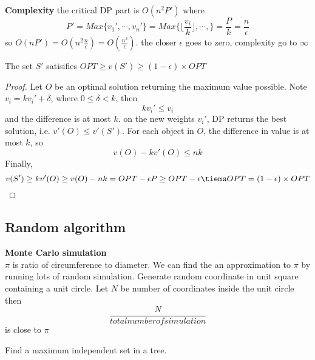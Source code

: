 \documentclass[11pt]{article}
\begin{document}
\begin{defn*}
    \textbf{Complexity} the critical DP part is $O(n^2P')$ where 
    \[
        P' = Max \{v_1', \cdots, v_n' \} = Max \{ \lfloor \frac{v_i}{k} \rfloor, \cdots, \} = \frac{P}{k} = \frac{n}{\epsilon}
    \]
    so $O(nP') = O(n^2 \frac{n}{\epsilon}) = O(\frac{n^3}{\epsilon})$. the closer $\epsilon$ goes to zero, complexity go to $\infty$
\end{defn*}



\begin{lemma*}
    The set $S'$ satisifies $OPT \geq v(S') \geq (1 - \epsilon) \times OPT$
    \begin{proof}
        Let $O$ be an optimal solution returning the maximum value possible. Note $v_i = kv_i' + \delta$, where $0\leq \delta < k$, then 
        \[
            k v_i' \leq v_i
        \]
        and the difference is at most $k$. on the new weights $v_i'$, DP returns the best solution, i.e. $v'(O) \leq v'(S')$. For each object in $O$, the difference in value is at most $k$, so
        \[
            v(O) - kv'(O) \leq nk
        \]
        Finally, 
        \[
            v(S') \geq kv'(O) \geq v(O) - nk = OPT - \epsilon P \geq OPT - \epsilon \tiems OPT = (1 - \epsilon)\times OPT
        \]
    \end{proof}
\end{lemma*}


\subsection*{Random algorithm}


\begin{defn*}
    \textbf{Monte Carlo simulation}\\ 
    $\pi$ is ratio of circumference to diameter. We can find the an approximation to $\pi$ by running lots of random simulation. Generate random coordinate in unit square containing a unit circle. Let $N$ be number of coordinates inside the unit circle  then
    \[
        \frac{N}{total number of simulation}
    \]
    is close to $\pi$
\end{defn*}


\begin{example}
    Find a maximum independent set in a tree. 
\end{example}
\end{document}
